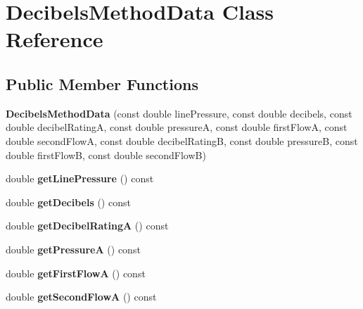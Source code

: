 \hypertarget{class_decibels_method_data}{}\section{Decibels\+Method\+Data Class Reference}
\label{class_decibels_method_data}
\subsection*{Public Member Functions}
\begin{DoxyCompactItemize}
\item 
\mbox{\label{class_decibels_method_data_a7c482e723ee17a137b7f120e1b942e3e}} 
{\bfseries Decibels\+Method\+Data} (const double line\+Pressure, const double decibels, const double decibel\+RatingA, const double pressureA, const double first\+FlowA, const double second\+FlowA, const double decibel\+RatingB, const double pressureB, const double first\+FlowB, const double second\+FlowB)
\item 
\mbox{\label{class_decibels_method_data_a329863849958d0604ff628cbc12160b9}} 
double {\bfseries get\+Line\+Pressure} () const
\item 
\mbox{\label{class_decibels_method_data_a58fdf6f9852ac552623fddc31f1bf2f7}} 
double {\bfseries get\+Decibels} () const
\item 
\mbox{\label{class_decibels_method_data_a9eef52f267377c5ab399babff216c3e6}} 
double {\bfseries get\+Decibel\+RatingA} () const
\item 
\mbox{\label{class_decibels_method_data_a46a911b5541c6bf466177ca65f1e6abc}} 
double {\bfseries get\+PressureA} () const
\item 
\mbox{\label{class_decibels_method_data_a3967d6bdcbc252db6ec936ce17d51eca}} 
double {\bfseries get\+First\+FlowA} () const
\item 
\mbox{\label{class_decibels_method_data_a77b2262f664c8678ad434caea229fc5a}} 
double {\bfseries get\+Second\+FlowA} () const
\item 

\end{DoxyCompactItemize}
